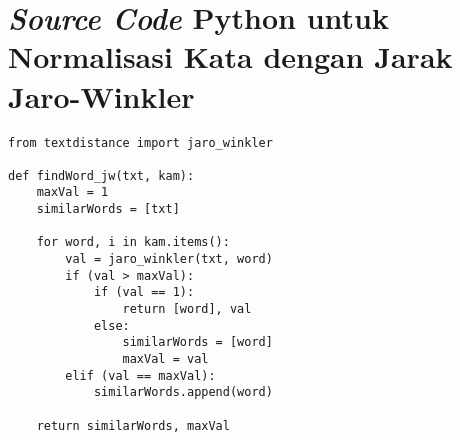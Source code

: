 \chapter{\textit{Source Code} Python untuk Normalisasi Kata dengan Jarak Jaro-Winkler}

\begin{lstlisting}
from textdistance import jaro_winkler

def findWord_jw(txt, kam):
    maxVal = 1
    similarWords = [txt]
    
    for word, i in kam.items():
        val = jaro_winkler(txt, word)
        if (val > maxVal):
            if (val == 1):
                return [word], val
            else:
                similarWords = [word]
                maxVal = val
        elif (val == maxVal):
            similarWords.append(word)
            
    return similarWords, maxVal
\end{lstlisting}